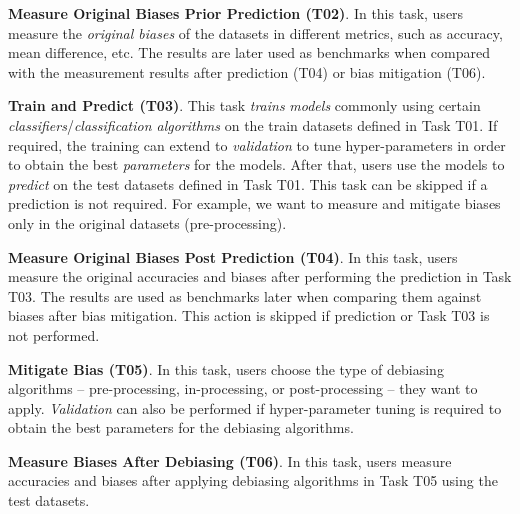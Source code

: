\documentclass[sigconf,review]{acmart}
\begin{document}
	\textbf{Measure Original Biases Prior Prediction (T02)}. In this task, users measure the \textit{original biases} of the datasets in different metrics, such as accuracy, mean difference, etc. The results are later used as benchmarks when compared with the measurement results after prediction (T04) or bias mitigation (T06).  
	
	\textbf{Train and Predict (T03)}. This task \textit{trains} \textit{models} commonly using certain \textit{classifiers}/\textit{classification algorithms} on the train datasets defined in Task T01. If required, the training can extend to \textit{validation} to tune hyper-parameters in order to obtain the best \textit{parameters} for the models. After that, users use the models to \textit{predict} on the test datasets defined in Task T01. This task can be skipped if a prediction is not required. For example, we want to measure and mitigate biases only in the original datasets (pre-processing).
	
	\textbf{Measure Original Biases Post Prediction (T04)}. In this task, users measure the original accuracies and biases after performing the prediction in Task T03. The results are used as benchmarks later when comparing them against biases after bias mitigation. This action is skipped if prediction or Task T03 is not performed.
	
	\textbf{Mitigate Bias (T05)}. In this task, users choose the type of debiasing algorithms -- pre-processing, in-processing, or post-processing -- they want to apply. \textit{Validation} can also be performed if hyper-parameter tuning is required to obtain the best parameters for the debiasing algorithms.
	
	\textbf{Measure Biases After Debiasing (T06)}. In this task, users measure accuracies and biases after applying debiasing algorithms in Task T05 using the test datasets. 
	
\end{document}
